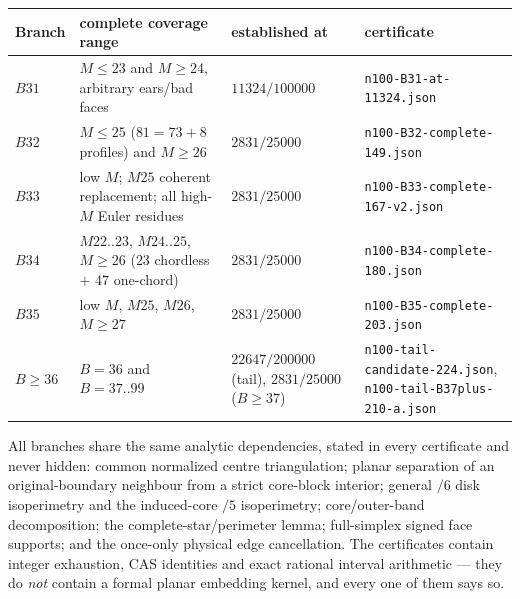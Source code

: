 \begin{center}
\footnotesize
\begin{tabular}{@{}>{\raggedright\arraybackslash}p{}>{\raggedright\arraybackslash}p{}>{\raggedright\arraybackslash}p{}>{\raggedright\arraybackslash}p{}@{}}
\toprule
Branch & complete coverage range & established at & certificate \\
\midrule
$B31$ & $M\le23$ and $M\ge24$, arbitrary ears/bad faces &
$11324/100000$ & \texttt{n100-\allowbreak{}B31-\allowbreak{}at-\allowbreak{}11324.json} \\
$B32$ & $M\le25$ ($81=73+8$ profiles) and $M\ge26$ &
$2831/25000$ & \texttt{n100-\allowbreak{}B32-\allowbreak{}complete-\allowbreak{}149.json} \\
$B33$ & low $M$; $M25$ coherent replacement; all high-$M$ Euler residues &
$2831/25000$ & \texttt{n100-\allowbreak{}B33-\allowbreak{}complete-\allowbreak{}167-\allowbreak{}v2.json} \\
$B34$ & $M22..23$, $M24..25$, $M\ge26$ ($23$ chordless $+$ $47$ one-chord) &
$2831/25000$ & \texttt{n100-\allowbreak{}B34-\allowbreak{}complete-\allowbreak{}180.json} \\
$B35$ & low $M$, $M25$, $M26$, $M\ge27$ &
$2831/25000$ & \texttt{n100-\allowbreak{}B35-\allowbreak{}complete-\allowbreak{}203.json} \\
$B\ge36$ & $B=36$ and $B=37..99$ &
$22647/200000$ (tail), $2831/25000$ ($B\ge37$) &
\texttt{n100-\allowbreak{}tail-\allowbreak{}candidate-\allowbreak{}224.json}, \texttt{n100-\allowbreak{}tail-\allowbreak{}B37plus-\allowbreak{}210-\allowbreak{}a.json} \\
\bottomrule
\end{tabular}
\end{center}

All branches share the same analytic dependencies, stated in every certificate and never hidden:
common normalized centre triangulation; planar separation of an original-boundary neighbour from a
strict core-block interior; general $/6$ disk isoperimetry and the induced-core $/5$ isoperimetry;
core/outer-band decomposition; the complete-star/perimeter lemma; full-simplex signed face supports;
and the once-only physical edge cancellation. The certificates contain integer exhaustion, CAS
identities and exact rational interval arithmetic --- they do \emph{not} contain a formal planar
embedding kernel, and every one of them says so.
